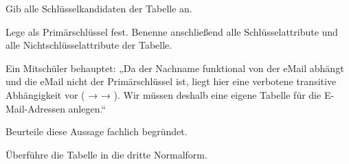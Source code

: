 \begin{compactitem}
\item[a)] Gib alle Schlüsselkandidaten der Tabelle  an.
\item[b)] Lege  als Primärschlüssel fest. Benenne 
anschließend alle Schlüsselattribute und alle Nichtschlüsselattribute der Tabelle.
\item[c)] Ein Mitschüler behauptet: „Da der Nachname funktional von der eMail 
abhängt und die eMail nicht der Primärschlüssel ist, liegt hier eine verbotene 
transitive Abhängigkeit vor ( →  
→ ). Wir müssen deshalb eine eigene Tabelle für die 
E-Mail-Adressen anlegen.“

Beurteile diese Aussage fachlich begründet.
\item[d)] Überführe die Tabelle  in die dritte Normalform.
\end{compactitem}


